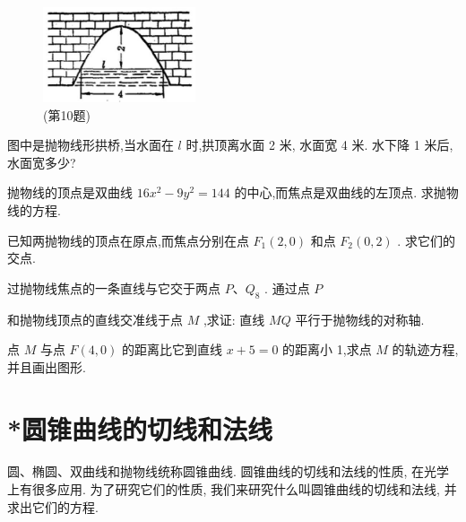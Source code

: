 \documentclass[lang=cn,newtx,10pt,scheme=chinese]{elegantbook}
\begin{document}
\begin{problemset}[习 题 八]
\begin{figure}[h]
  \centering
  \includegraphics[max width=0.4\textwidth]{images/01912cc2-ffb6-728e-9ae7-b113ff05c64b_116_944899.jpg}
  \caption{(第10题)}
\end{figure}



\item 图中是抛物线形拱桥,当水面在 \(l\) 时,拱顶离水面 2 米, 水面宽 4 米. 水下降 1 米后, 水面宽多少?

\item 抛物线的顶点是双曲线 \({16}{x}^{2} - 9{y}^{2} = {144}\) 的中心,而焦点是双曲线的左顶点. 求抛物线的方程.

\item 已知两抛物线的顶点在原点,而焦点分别在点 \({F}_{1}\left( {2,0}\right)\) 和点 \({F}_{2}\left( {0,2}\right)\) . 求它们的交点.

\item 过抛物线焦点的一条直线与它交于两点 \(P\text{、}{Q}_{8}\) . 通过点 \(P\)

和抛物线顶点的直线交准线于点 \(M\) ,求证: 直线 \({MQ}\) 平行于抛物线的对称轴.

\item 点 \(M\) 与点 \(F\left( {4,0}\right)\) 的距离比它到直线 \(x + 5 = 0\) 的距离小 1,求点 \(M\) 的轨迹方程,并且画出图形.

\end{problemset}

\section{*圆锥曲线的切线和法线}

圆、椭圆、双曲线和抛物线统称圆锥曲线. 圆锥曲线的切线和法线的性质, 在光学上有很多应用. 为了研究它们的性质, 我们来研究什么叫圆锥曲线的切线和法线, 并求出它们的方程.
\end{document}
